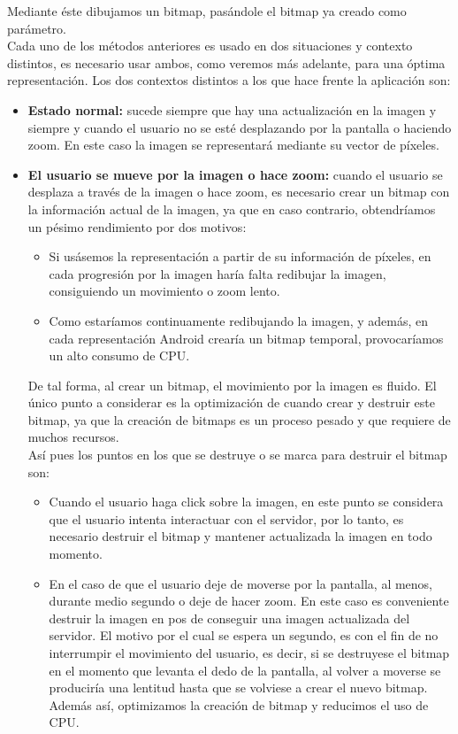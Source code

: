 Mediante éste dibujamos un bitmap, pasándole el bitmap ya creado como parámetro.\\

Cada uno de los métodos anteriores es usado en dos situaciones y contexto distintos, es necesario usar ambos, como veremos más adelante, para una óptima representación. Los dos contextos distintos a los que hace frente la aplicación son:\\

\begin{itemize}
\item \textbf{Estado normal:} sucede siempre que hay una actualización en la imagen y siempre y cuando el usuario no se esté desplazando por la pantalla o haciendo zoom. En este caso la imagen se representará mediante su vector de píxeles.

\item \textbf{El usuario se mueve por la imagen o hace zoom:} cuando el usuario se desplaza a través de la imagen o hace zoom, es necesario crear un bitmap con la información actual de la imagen, ya que en caso contrario, obtendríamos un pésimo rendimiento por dos motivos:

\begin{itemize}
\item Si usásemos la representación a partir de su información de píxeles, en cada progresión por la imagen haría falta redibujar la imagen, consiguiendo un movimiento o zoom lento.
\item Como estaríamos continuamente redibujando la imagen, y además, en cada representación Android crearía un bitmap temporal,     provocaríamos un alto consumo de CPU.
\end{itemize}

De tal forma, al crear un bitmap, el movimiento por la imagen es fluido. El único punto a considerar es la optimización de cuando crear y destruir este bitmap, ya que la creación de bitmaps es un proceso pesado y que requiere de muchos recursos.\\

Así pues los puntos en los que se destruye o se marca para destruir el bitmap son:

\begin{itemize}
\item Cuando el usuario haga click sobre la imagen, en este punto se considera que el usuario intenta interactuar con el servidor, por lo tanto, es necesario destruir el bitmap y mantener actualizada la imagen en todo momento.
\item En el caso de que el usuario deje de moverse por la pantalla, al menos, durante medio segundo o deje de hacer zoom. En este caso es conveniente destruir la imagen en pos de conseguir una imagen actualizada del servidor. El motivo por el cual se espera un segundo, es con el fin de no interrumpir el movimiento del usuario, es decir, si se destruyese el bitmap en el momento que levanta el dedo de la pantalla, al volver a moverse se produciría una lentitud hasta que se volviese a crear el nuevo bitmap. Además así, optimizamos la creación de bitmap y reducimos el uso de CPU.
\end{itemize}

\end{itemize}

